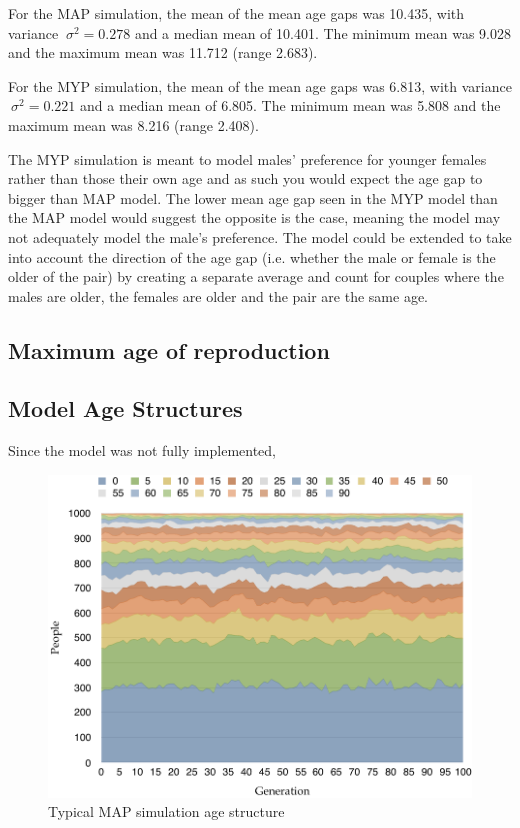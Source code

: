 \documentclass[authoryearcitations]{UoYCSproject}
\begin{document}
For the MAP simulation, the mean of the mean age gaps was 10.435, with variance $\ \sigma^2 = 0.278 $ and a median mean of 10.401. The minimum mean was 9.028 and the maximum mean was 11.712 (range 2.683). 

For the MYP simulation, the mean of the mean age gaps was 6.813, with variance $\ \sigma^2 = 0.221 $ and a median mean of 6.805. The minimum mean was 5.808 and the maximum mean was 8.216 (range 2.408).

The MYP simulation is meant to model males' preference for younger females rather than those their own age and as such you would expect the age gap to bigger than MAP model. The lower mean age gap seen in the MYP model than the MAP model would suggest the opposite is the case, meaning the model may not adequately model the male's preference. The model could be extended to take into account the direction of the age gap (i.e. whether the male or female is the older of the pair) by creating a separate average and  count for couples where the males are older, the females are older and the pair are the same age.

\subsection{Maximum age of reproduction}


\subsection{Model Age Structures}
Since the model was not fully implemented, 

\begin{figure}[h]
\includegraphics[width=\textwidth]{map_age_data}
\caption{Typical MAP simulation age structure}
\label{fig:mapResultsGraph}
\end{figure}
\end{document}
